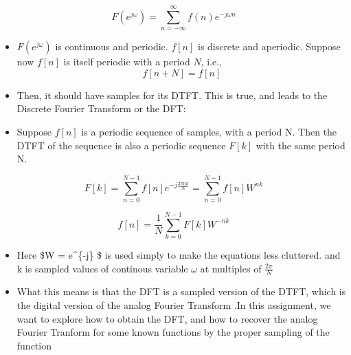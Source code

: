 \documentclass[11pt]{article}
\begin{document}
\begin{equation}
F(e^{j\omega}) = \sum_{n = -\infty}^{\infty} f(n)e^{-j\omega n}
\end{equation}

\begin{itemize}
\item
  \(F(e^{j\omega})\) is continuous and periodic. \(f[n]\) is discrete
  and aperiodic. Suppose now \(f[n]\) is itself periodic with a period
  \(N\), i.e., \[ f[n+N] = f[n] \]
\item
  Then, it should have samples for its DTFT. This is true, and leads to
  the Discrete Fourier Transform or the DFT:
\item
  Suppose \(f[n]\) is a periodic sequence of samples, with a period N.
  Then the DTFT of the sequence is also a periodic sequence \(F[k]\)
  with the same period N.
\end{itemize}

\begin{equation}
F[k] = \sum_{n = 0}^{N-1} f[n]e^{-j\frac {2\pi nk}{N}} = \sum_{n = 0}^{N-1} f[n]W^{nk}
\end{equation}

\begin{equation}
f[n] = \frac{1}{N} \sum_{k = 0}^{N-1} F[k]W^{-nk}
\end{equation}

\begin{itemize}
\item
  Here \$W = e\^{}\{-j\} \$ is used simply to make the
  equations less cluttered. and k is sampled values of continous
  variable \(\omega\) at multiples of \(\frac{2\pi}{N}\)
\item
  What this means is that the DFT is a sampled version of the DTFT,
  which is the digital version of the analog Fourier Transform .In this
  assignment, we want to explore how to obtain the DFT, and how to
  recover the analog Fourier Tranform for some known functions by the
  proper sampling of the function
\end{itemize}

	

	

	
		
	
	
		
	
		
			
		
	
		
			
		
	
		
			
\end{document}
